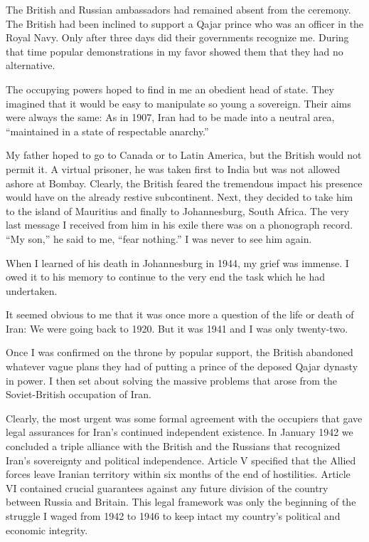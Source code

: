 The British and Russian ambassadors had remained absent from the ceremony. The British had been inclined to support a Qajar prince who was an officer in the Royal Navy. Only after three days did their governments recognize me. During that time popular demonstrations in my favor showed them that they had no alternative. 

The occupying powers hoped to find in me an obedient head of state. They imagined that it would be easy to manipulate so young a sovereign. Their aims were always the same: As in 1907, Iran had to be made into a neutral area, “maintained in a state of respectable anarchy.” 

My father hoped to go to Canada or to Latin America, but the British would not permit it. A virtual prisoner, he was taken first to India but was not allowed ashore at Bombay. Clearly, the British feared the tremendous impact his presence would have on the already restive subcontinent. Next, they decided to take him to the island of Mauritius and finally to Johannesburg, South Africa. The very last message I received from him in his exile there was on a phonograph record. “My son,” he said to me, “fear nothing.” I was never to see him again. 

When I learned of his death in Johannesburg in 1944, my grief was immense. I owed it to his memory to continue to the very end the task which he had undertaken. 

It seemed obvious to me that it was once more a question of the life or death of Iran: We were going back to 1920. But it was 1941 and I was only twenty-two. 

Once I was confirmed on the throne by popular support, the British abandoned whatever vague plans they had of putting a prince of the deposed Qajar dynasty in power. I then set about solving the massive problems that arose from the Soviet-British occupation of Iran. 

Clearly, the most urgent was some formal agreement with the occupiers that gave legal assurances for Iran's continued independent existence. In January 1942 we concluded a triple alliance with the British and the Russians that recognized Iran's sovereignty and political independence. Article V specified that the Allied forces leave Iranian territory within six months of the end of hostilities. Article VI contained crucial guarantees against any future division of the country between Russia and Britain. This legal framework was only the beginning of the struggle I waged from 1942 to 1946 to keep intact my country’s political and economic integrity. 


